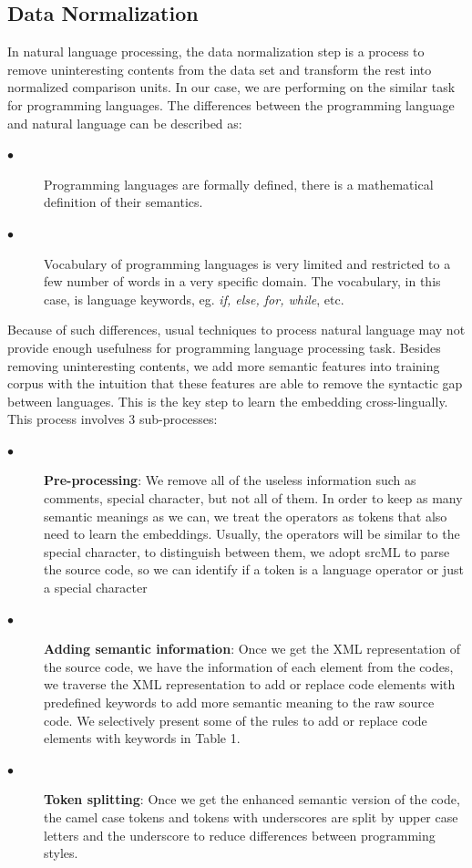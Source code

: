 \subsection{Data Normalization}
\label{sub:normalization}
In natural language processing, the data normalization step is a process to remove uninteresting contents from the data set and transform the rest into normalized comparison units. In our case, we are performing on the similar task for programming languages. The differences between the programming language and natural language can be described as:
\begin{description}
	\item [$\bullet$] Programming languages are formally defined, there is a mathematical definition of their semantics.
	\item [$\bullet$] Vocabulary of programming languages is very limited and restricted to a few number of words in a very specific domain. The vocabulary, in this case, is language keywords, eg. \textit{if, else, for, while}, etc.
\end{description}
Because of such differences, usual techniques to process natural language may not provide enough usefulness for programming language processing task.
Besides removing uninteresting contents, we add more semantic features into training corpus with the intuition that these features are able to remove the syntactic gap between languages. This is the key step to learn the embedding cross-lingually. This process involves 3 sub-processes:

\begin{description}
	\item [$\bullet$] \textbf{Pre-processing}: We remove all of the useless information such as comments, special character, but not all of them. In order to keep as many semantic meanings as we can, we treat the operators as tokens that also need to learn the embeddings. Usually, the operators will be similar to the special character, to distinguish between them, we adopt srcML \cite{collard2011lightweight} to parse the source code, so we can identify if a token is a language operator or just a special character
	\item [$\bullet$] \textbf{Adding semantic information}: Once we get the XML representation of the source code, we have the information of each element from the codes, we traverse the XML representation to add or replace code elements with predefined keywords to add more semantic meaning to the raw source code. We selectively present some of the rules to add or replace code elements with keywords in Table 1.
	\item [$\bullet$] \textbf{Token splitting}: Once we get the enhanced semantic version of the code, the camel case tokens and tokens with underscores are split by upper case letters and the underscore to reduce differences between programming styles.
\end{description}

